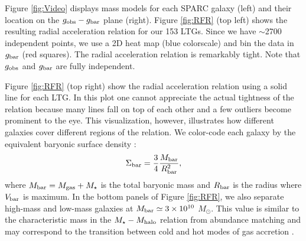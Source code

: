 \documentclass[apjl, twocolappendix]{emulateapj}
\begin{document}
Figure \ref{fig:Video} displays mass models for each SPARC galaxy (left) and their location on the $g_{\rm obs}-g_{\rm bar}$ plane (right). Figure \ref{fig:RFR} (top left) shows the resulting radial acceleration relation for our 153 LTGs. Since we have $\sim$2700 independent points, we use a 2D heat map (blue colorscale) and bin the data in $g_{\rm bar}$ (red squares). The radial acceleration relation is remarkably tight. Note that $g_{\rm obs}$ and $g_{\rm bar}$ are fully independent.

Figure \ref{fig:RFR} (top right) show the radial acceleration relation using a solid line for each LTG. In this plot one cannot appreciate the actual tightness of the relation because many lines fall on top of each other and a few outliers become prominent to the eye. This visualization, however, illustrates how different galaxies cover different regions of the relation. We color-code each galaxy by the equivalent baryonic surface density \citep{McGaugh2005}:
\begin{equation}
 \Sigma_{\rm bar} = \dfrac{3}{4}\dfrac{M_{\rm bar}}{R_{\rm bar}^{2}},
\end{equation}
where $M_{\rm bar} = M_{\rm gas} + M_{\star}$ is the total baryonic mass and $R_{\rm bar}$ is the radius where $V_{\rm bar}$ is maximum. 
In the bottom panels of Figure \ref{fig:RFR}, we also separate high-mass and low-mass galaxies at $M_{\rm bar} \simeq 3\times 10^{10}$ $M_{\odot}$. This value is similar to the characteristic mass in the $M_{\star}-M_{\rm halo}$ relation from abundance matching \citep{Moster2013} and may correspond to the transition between cold and hot modes of gas accretion \citep{Dekel2006}.
\end{document}
